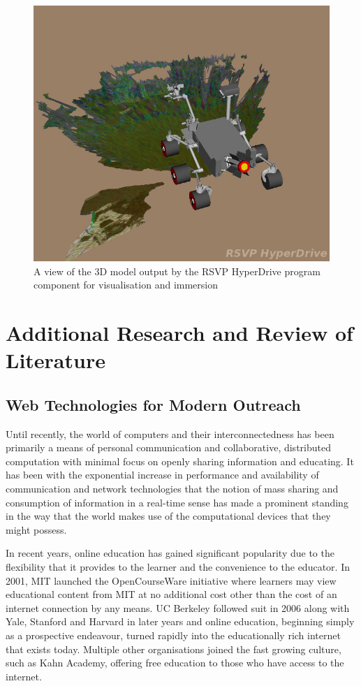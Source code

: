       
      \begin{figure}[H]
        \centering
        \includegraphics[width=0.7\linewidth]{figures/litreview-hyperdriveCrop}
        \caption[A view of the 3D model output by the RSVP HyperDrive program component for visualisation and immersion]{A view of the 3D model output by the RSVP HyperDrive program component for visualisation and immersion \cite{fig:litreview-litreview-hyperdrivecrop_cite}}
        \label{fig:litreview-hyperdrivecrop}
      \end{figure}

  
  \section{Additional Research and Review of Literature}
    \subsection{Web Technologies for Modern Outreach}
      Until recently, the world of computers and their interconnectedness has been primarily a means of personal communication and collaborative, distributed computation with minimal focus on openly sharing information and educating. It has been with the exponential increase in performance and availability of communication and network technologies that the notion of mass sharing and consumption of information in a real-time sense has made a prominent standing in the way that the world makes use of the computational devices that they might possess.
      
      In recent years, online education has gained significant popularity due to the flexibility that it provides to the learner and the convenience to the educator. In 2001, MIT launched the OpenCourseWare initiative \cite{mit2001opencourseware} where learners may view educational content from MIT at no additional cost other than the cost of an internet connection by any means. UC Berkeley followed suit in 2006 along with Yale, Stanford and Harvard in later years and online education, beginning simply as a prospective endeavour, turned rapidly into the educationally rich internet that exists today. Multiple other organisations joined the fast growing culture, such as Kahn Academy, offering free education to those who have access to the internet.
      
